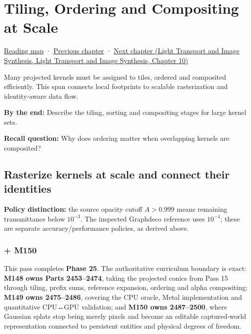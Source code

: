 \hypertarget{04-visual-computing-ii-ch039}{}
\chapter{Tiling, Ordering and Compositing at Scale}\label{stagechapter:04-visual-computing-ii-ch039}\label{04-visual-computing-ii-ch039-tiling-ordering-and-compositing-at-scale}

\hyperref[volume-reading-map]{Reading map} · \hyperref[04-visual-computing-ii-ch038-projecting-ellipsoids-into-screen-space-conics]{Previous chapter} · \href{../04-Light-Transport-and-Image-Synthesis/main.pdf\#nameddest=04-visual-computing-ii-ch040-lighting-reconstruction-and-surface-motion}{Next chapter (Light Transport and Image Synthesis, Light Transport and Image Synthesis, Chapter 10)}

Many projected kernels must be assigned to tiles, ordered and composited efficiently. This span connects local footprints to scalable rasterization and identity-aware data flow.

\textbf{By the end:} Describe the tiling, sorting and compositing stages for large kernel sets.

\textbf{Recall question:} Why does ordering matter when overlapping kernels are composited?

\section{Rasterize kernels at scale and connect their identities}\label{04-visual-computing-ii-ch039-rasterize-kernels-at-scale-and-connect-their-identities}

\textbf{Policy distinction:} the source opacity cutoff \(A>0.999\) means remaining transmittance below \(10^{-3}\). The inspected Graphdeco reference uses \(10^{-4}\); these are separate accuracy/performance policies, as derived above.

\subsection{+ M150}\label{04-visual-computing-ii-ch039-m150}

This pass completes \textbf{Phase 25}. The authoritative curriculum boundary is exact: \textbf{M148 owns Parts 2453--2474}, taking the projected conics from Pass 15 through tiling, prefix sums, reference expansion, ordering and alpha compositing; \textbf{M149 owns 2475--2486}, covering the CPU oracle, Metal implementation and quantitative CPU↔GPU validation; and \textbf{M150 owns 2487--2500}, where Gaussian splats stop being merely pixels and become an editable captured-world representation connected to persistent entities and physical degrees of freedom.

